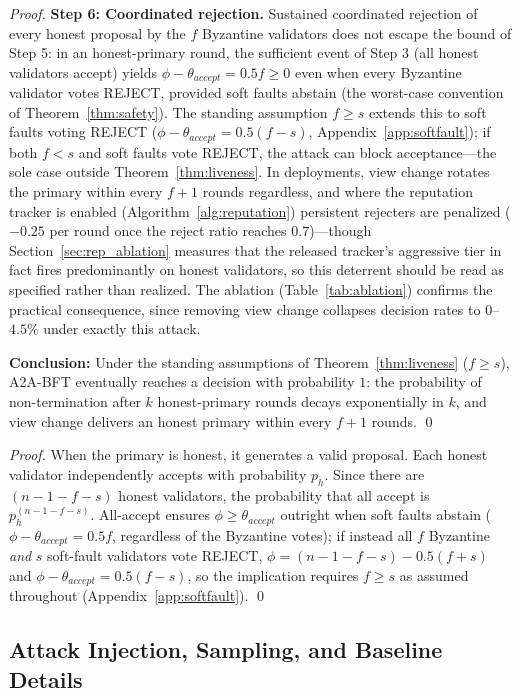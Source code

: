 \documentclass{article}
\begin{document}
\begin{proof}
\textbf{Step 6: Coordinated rejection.}
Sustained coordinated rejection of every honest proposal by the $f$ Byzantine validators does not escape the bound of Step 5: in an honest-primary round, the sufficient event of Step 3 (all honest validators accept) yields $\phi - \theta_{accept} = 0.5f \geq 0$ even when every Byzantine validator votes REJECT, provided soft faults abstain (the worst-case convention of Theorem~\ref{thm:safety}). The standing assumption $f \geq s$ extends this to soft faults voting REJECT ($\phi - \theta_{accept} = 0.5(f-s)$, Appendix~\ref{app:softfault}); if both $f < s$ and soft faults vote REJECT, the attack can block acceptance---the sole case outside Theorem~\ref{thm:liveness}. In deployments, view change rotates the primary within every $f+1$ rounds regardless, and where the reputation tracker is enabled (Algorithm~\ref{alg:reputation}) persistent rejecters are penalized ($-0.25$ per round once the reject ratio reaches $0.7$)---though Section~\ref{sec:rep_ablation} measures that the released tracker's aggressive tier in fact fires predominantly on honest validators, so this deterrent should be read as specified rather than realized. The ablation (Table~\ref{tab:ablation}) confirms the practical consequence, since removing view change collapses decision rates to $0$--$4.5\%$ under exactly this attack.

\textbf{Conclusion:} Under the standing assumptions of Theorem~\ref{thm:liveness} ($f \geq s$), A2A-BFT eventually reaches a decision with probability $1$: the probability of non-termination after $k$ honest-primary rounds decays exponentially in $k$, and view change delivers an honest primary within every $f+1$ rounds. \qed
\end{proof}

\begin{proof}
When the primary is honest, it generates a valid proposal. Each honest validator independently accepts with probability $p_h$. Since there are $(n-1-f-s)$ honest validators, the probability that all accept is $p_h^{(n-1-f-s)}$. All-accept ensures $\phi \geq \theta_{accept}$ outright when soft faults abstain ($\phi - \theta_{accept} = 0.5f$, regardless of the Byzantine votes); if instead all $f$ Byzantine \emph{and} $s$ soft-fault validators vote REJECT, $\phi = (n{-}1{-}f{-}s) - 0.5(f{+}s)$ and $\phi - \theta_{accept} = 0.5(f-s)$, so the implication requires $f \geq s$ as assumed throughout (Appendix~\ref{app:softfault}). \qed
\end{proof}

\subsection{Attack Injection, Sampling, and Baseline Details}\label{app:attacks}
\end{document}
